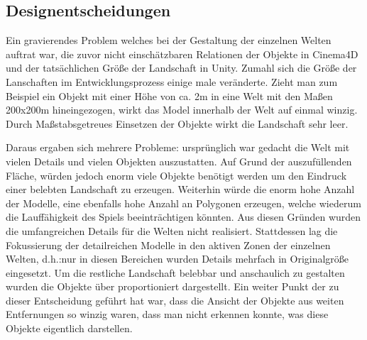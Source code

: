 \subsection{Designentscheidungen}
 
Ein gravierendes Problem welches bei der Gestaltung der einzelnen Welten auftrat war, die zuvor nicht einschätzbaren Relationen der Objekte in Cinema4D und der tatsächlichen Größe der Landschaft in Unity. Zumahl sich die Größe der Lanschaften im Entwicklungsprozess einige male veränderte. Zieht man zum Beispiel ein Objekt mit einer Höhe von ca. 2m in eine Welt mit den Maßen 200x200m hineingezogen, wirkt das Model innerhalb der Welt auf einmal winzig. Durch Maßstabsgetreues Einsetzen der Objekte wirkt die Landschaft sehr leer. 

Daraus ergaben sich mehrere Probleme: ursprünglich war gedacht die Welt mit vielen Details und vielen Objekten auszustatten. Auf Grund der auszufüllenden Fläche, würden jedoch enorm viele Objekte benötigt werden um den Eindruck einer belebten Landschaft zu erzeugen. Weiterhin würde die enorm hohe Anzahl der Modelle, eine ebenfalls hohe Anzahl an Polygonen erzeugen, welche wiederum die Lauffähigkeit des Spiels beeinträchtigen könnten. Aus diesen Gründen wurden die umfangreichen Details für die Welten nicht realisiert. Stattdessen lag die Fokussierung der detailreichen Modelle in den aktiven Zonen der einzelnen Welten, d.h.:nur in diesen Bereichen wurden Details mehrfach in Originalgröße eingesetzt. Um die restliche Landschaft belebbar und anschaulich zu gestalten wurden die Objekte über proportioniert dargestellt. Ein weiter Punkt der zu dieser Entscheidung geführt hat war, dass die Ansicht der Objekte aus weiten Entfernungen so winzig waren, dass man nicht erkennen konnte, was diese Objekte eigentlich darstellen.

